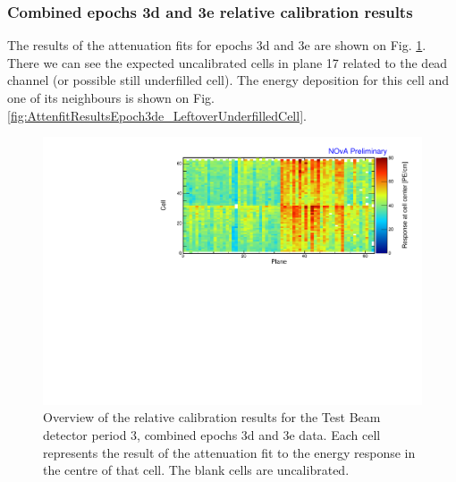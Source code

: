 \subsubsection*{Combined epochs 3d and 3e relative calibration results}

The results of the attenuation fits for epochs 3d and 3e are shown on Fig. \ref{fig:CellCentreResponseEp3de}. There we can see the expected uncalibrated cells in plane 17 related to the dead channel (or possible still underfilled cell). The energy deposition for this cell and one of its neighbours is shown on Fig. \ref{fig:AttenfitResultsEpoch3de_LeftoverUnderfilledCell}.

\begin{figure}[!hbtp]
\centering
\includegraphics[width=\textwidth]{PlotsTBCalibTechnote/CellResponseAtCentre_epoch3de_Limited_NOvAPlotStyle.pdf}
\caption{Overview of the relative calibration results for the Test Beam detector period 3, combined epochs 3d and 3e data. Each cell represents the result of the attenuation fit to the energy response in the centre of that cell. The blank cells are uncalibrated.}
\label{fig:CellCentreResponseEp3de}
\end{figure}

